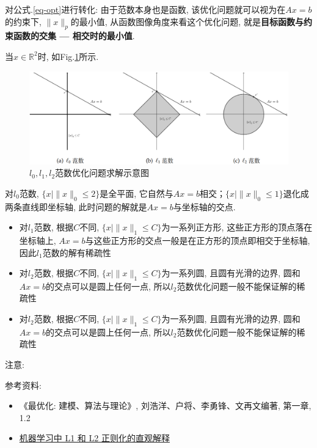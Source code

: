 对公式.\ref{eq-opt}进行转化: 由于范数本身也是函数, 该优化问题就可以视为在$A x = b$的约束下, $\|x\|_p$的最小值, 从函数图像角度来看这个优化问题, 就是\textbf{目标函数与约束函数的交集 --- 相交时的最小值}. 

当$x \in \mathbb{R}^2$时, 如Fig.\ref{fig:norm optimize}所示. 
\begin{figure}[h]
	\centering
	\includegraphics[width=.85\textwidth]{pics/norm optimize.png}
	\caption{$l_0, l_1, l_2$范数优化问题求解示意图}
	\label{fig:norm optimize}
\end{figure}
对$l_0$范数, $\{x | \|x\|_0 \leq 2\}$是全平面, 它自然与$A x = b$相交；$\{x | \|x\|_0 \leq 1\}$退化成两条直线即坐标轴, 此时问题的解就是$A x = b$与坐标轴的交点. 
\begin{itemize}
	\item 对$l_1$范数, 根据$C$不同, $\{x | \|x\|_1 \leq C\}$为一系列正方形, 这些正方形的顶点落在坐标轴上, $A x = b$与这些正方形的交点一般是在正方形的顶点即相交于坐标轴, 因此$l_1$范数的解有稀疏性
	\item 对$l_2$范数, 根据$C$不同, $\{x | \|x\|_1 \leq C\}$为一系列圆, 且圆有光滑的边界, 圆和$A x = b$的交点可以是圆上任何一点, 所以$l_2$范数优化问题一般不能保证解的稀疏性
	\item 对$l_2$范数, 根据$C$不同, $\{x | \|x\|_1 \leq C\}$为一系列圆, 且圆有光滑的边界, 圆和$A x = b$的交点可以是圆上任何一点, 所以$l_2$范数优化问题一般不能保证解的稀疏性
\end{itemize}

注意: 

参考资料: 
\begin{itemize}
	\item《最优化: 建模、算法与理论》, 刘浩洋、户将、李勇锋、文再文编著, 第一章, 1.2
	\item \href{https://blog.csdn.net/red_stone1/article/details/80755144}{机器学习中 L1 和 L2 正则化的直观解释}
\end{itemize}


